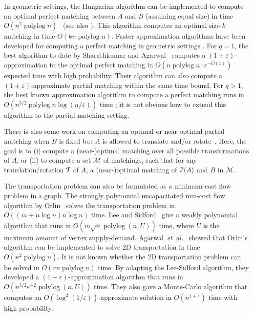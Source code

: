 \documentclass[a4paper,UKenglish]{socg-lipics-v2018}
\makeatletter
\def\etal{\emph{et~al.}}
\def\etal{\textit{et~al.}}
\def\polylog{\mathop{\mathrm{polylog}}}
\def\eps{\varepsilon}
\theoremstyle{plain}
\numberwithin{figure}{section}
\def\n@te#1{\textsf{\boldmath \textbf{$\langle\!\langle$#1$\rangle\!\rangle$}}\leavevmode}
\def\note#1{\textcolor{red}{\n@te{#1}}}
\makeatother
\begin{document}
In geometric settings, the Hungarian algorithm can be implemented to compute
an optimal perfect matching between $A$ and $B$ (assuming equal size)
in time $O(n^2\polylog n)$~\cite{KMRSS17} (see also \cite{Vaidya89,AES99}).
This algorithm computes an optimal size-$k$ matching in time $O(kn\polylog n)$.
Faster approximation algorithms have been developed for computing a perfect
matching in geometric settings \cite{Vaidya89,V98,AV04,SA12}.
For $q=1$, the best algorithm to date by Sharathkumar and Agarwal~\cite{SA12m}
computes a $(1+\eps)$-approximation to the optimal perfect matching in
$O(n\polylog n \cdot \eps^{-O(1)})$ expected time with high probability.
Their algorithm can also compute a $(1+\eps)$-approximate partial
matching within the same time bound.
For $q > 1$, the best known approximation algorithm to compute a perfect
matching runs in $O(n^{3/2}\polylog n \log(n/\eps))$ time \cite{SA12};
it is not obvious how to extend this algorithm to the partial matching setting.

There is also some work on computing an optimal or near-optimal partial
matching when $B$ is fixed but $A$ is allowed to translate and/or rotate~\cite{CGKR08,R10,AHJKRST18,AKKMRSX18}.
Here, the goal is to (i) compute a (near-)optimal matching over all possible
transformations of $A$, or (ii) to compute a set $\mathcal{M}$ of matchings,
such that for any translation/rotation $\EuScript{T}$ of $A$, a (near-)optimal
matching of $\EuScript{T}(A)$ and $B$ in $\mathcal{M}$.

The transportation problem can also be formulated as a minimum-cost flow
problem in a graph.
The strongly polynomial uncapacitated min-cost flow algorithm by
Orlin~\cite{O93} solves the transportation problem in
$O((m + n\log n) n\log n)$ time.
Lee and Sidford~\cite{LS13b} give a weakly polynomial algorithm that runs in
$O(m\sqrt{n}\polylog(n, U))$ time, where $U$ is the maximum amount of vertex supply-demand.
Agarwal~\etal~\cite{AFPVX17} showed that Orlin's algorithm can be
implemented to solve 2D transportation in time $O(n^2\polylog n)$.
It is not known whether the 2D transportation problem can be solved in
$O(rn\polylog n)$ time.
By adapting the Lee-Sidford algorithm, they developed a
$(1+\eps)$-approximation algorithm that runs in $O(n^{3/2}\eps^{-2}\polylog(n, U))$ time.
They also gave a Monte-Carlo algorithm that computes an
$O(\log^2(1/\eps))$-approximate solution in $O(n^{1+\eps})$ time with
high probability.
\end{document}
